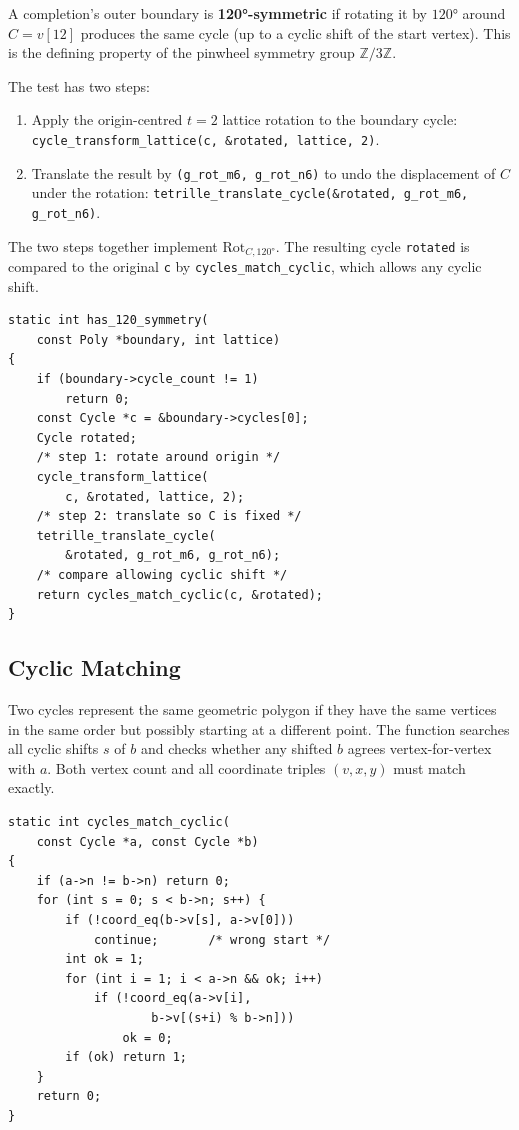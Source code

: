 \documentclass[10pt,a4paper]{article}
\let\polysubsection\subsection
\renewcommand\subsection{\needspace{0.12\textheight}\polysubsection}
\newcommand{\code}[1]{\texttt{\small #1}}
\begin{document}
\begin{tcolorbox}[dualbox, title={\code{has\_120\_symmetry}}]
  A completion's outer boundary is \textbf{120°-symmetric} if rotating it
  by $120°$ around $C = v[12]$ produces the same cycle (up to a cyclic
  shift of the start vertex).  This is the defining property of the pinwheel
  symmetry group $\mathbb{Z}/3\mathbb{Z}$.

  The test has two steps:
  \begin{enumerate}
    \item Apply the origin-centred $t=2$ lattice rotation to the boundary
      cycle: \code{cycle\_transform\_lattice(c, \&rotated, lattice, 2)}.
    \item Translate the result by \code{(g\_rot\_m6, g\_rot\_n6)} to undo
      the displacement of $C$ under the rotation:
      \code{tetrille\_translate\_cycle(\&rotated, g\_rot\_m6, g\_rot\_n6)}.
  \end{enumerate}
  The two steps together implement $\text{Rot}_{C,120°}$.
  The resulting cycle \code{rotated} is compared to the original \code{c}
  by \code{cycles\_match\_cyclic}, which allows any cyclic shift.
\tcblower
\begin{verbatim}
static int has_120_symmetry(
    const Poly *boundary, int lattice)
{
    if (boundary->cycle_count != 1)
        return 0;
    const Cycle *c = &boundary->cycles[0];
    Cycle rotated;
    /* step 1: rotate around origin */
    cycle_transform_lattice(
        c, &rotated, lattice, 2);
    /* step 2: translate so C is fixed */
    tetrille_translate_cycle(
        &rotated, g_rot_m6, g_rot_n6);
    /* compare allowing cyclic shift */
    return cycles_match_cyclic(c, &rotated);
}
\end{verbatim}
\end{tcolorbox}

\subsection{Cyclic Matching}

\begin{tcolorbox}[dualbox, title={\code{cycles\_match\_cyclic}}]
  Two cycles represent the same geometric polygon if they have the same
  vertices in the same order but possibly starting at a different point.
  The function searches all cyclic shifts $s$ of $b$ and checks whether
  any shifted $b$ agrees vertex-for-vertex with $a$.  Both vertex count
  and all coordinate triples $(v, x, y)$ must match exactly.
\tcblower
\begin{verbatim}
static int cycles_match_cyclic(
    const Cycle *a, const Cycle *b)
{
    if (a->n != b->n) return 0;
    for (int s = 0; s < b->n; s++) {
        if (!coord_eq(b->v[s], a->v[0]))
            continue;       /* wrong start */
        int ok = 1;
        for (int i = 1; i < a->n && ok; i++)
            if (!coord_eq(a->v[i],
                    b->v[(s+i) % b->n]))
                ok = 0;
        if (ok) return 1;
    }
    return 0;
}
\end{verbatim}
\end{tcolorbox}
\end{document}
